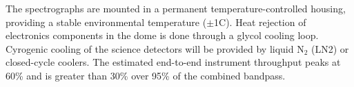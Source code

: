 \documentclass[oneside,11pt]{amsart}
\begin{document}

The spectrographs are mounted in a permanent temperature-controlled housing, providing a stable environmental temperature ($\pm$1C). Heat rejection of electronics components in the dome is done through a glycol cooling loop. Cyrogenic cooling of the science detectors will be provided by liquid N$_2$ (LN2) or closed-cycle coolers. The estimated end-to-end instrument throughput peaks at 60\% and is greater than 30\% over 95\% of the combined bandpass.




\end{document}
